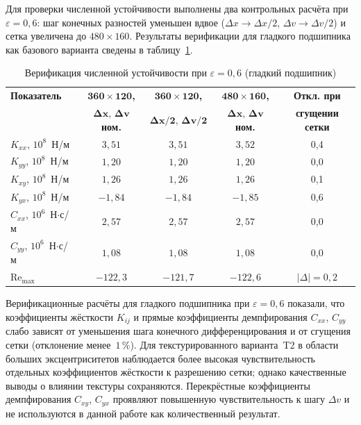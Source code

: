 Для проверки численной устойчивости выполнены два контрольных
расчёта при $\varepsilon = 0{,}6$: шаг конечных разностей
уменьшен вдвое ($\Delta x \to \Delta x/2$,
$\Delta v \to \Delta v/2$) и сетка увеличена до
$480 \times 160$. Результаты верификации для гладкого подшипника как базового
варианта сведены в таблицу~\ref{tab:dyn_verif}.

\begin{table}[!ht]
\centering
\caption{Верификация численной устойчивости при $\varepsilon = 0{,}6$
  (гладкий подшипник)}
\label{tab:dyn_verif}
\small
\begin{tabular}{|l|c|c|c|c|}
\hline
\textbf{Показатель}
  & $\mathbf{360 \times 120}$\textbf{,}
  & $\mathbf{360 \times 120}$\textbf{,}
  & $\mathbf{480 \times 160}$\textbf{,}
  & \textbf{Откл. при} \\
  & $\boldsymbol{\Delta x{,}\,\Delta v}$\textbf{ ном.}
  & $\boldsymbol{\Delta x/2{,}\,\Delta v/2}$
  & $\boldsymbol{\Delta x{,}\,\Delta v}$\textbf{ ном.}
  & \textbf{сгущении сетки} \\
\hline
$K_{xx}$, $10^8$~Н/м & $3{,}51$ & $3{,}51$ & $3{,}52$ & 0{,}4 \\
\hline
$K_{yy}$, $10^8$~Н/м & $1{,}20$ & $1{,}20$ & $1{,}20$ & 0{,}0 \\
\hline
$K_{xy}$, $10^8$~Н/м & $1{,}26$ & $1{,}26$ & $1{,}26$ & 0{,}1 \\
\hline
$K_{yx}$, $10^8$~Н/м & $-1{,}84$ & $-1{,}84$ & $-1{,}85$ & 0{,}6 \\
\hline
$C_{xx}$, $10^6$~Н$\cdot$с/м & $2{,}57$ & $2{,}57$ & $2{,}57$ & 0{,}0 \\
\hline
$C_{yy}$, $10^6$~Н$\cdot$с/м & $1{,}08$ & $1{,}08$ & $1{,}08$ & 0{,}0 \\
\hline
$\mathrm{Re}_{\max}$ & $-122{,}3$ & $-121{,}7$ & $-122{,}6$ & $|\Delta| = 0{,}2$ \\
\hline
\end{tabular}
\end{table}

\FloatBarrier

Верификационные расчёты для гладкого подшипника при
$\varepsilon = 0{,}6$ показали, что коэффициенты жёсткости
$K_{ij}$ и прямые коэффициенты демпфирования $C_{xx}$, $C_{yy}$
слабо зависят от уменьшения шага конечного дифференцирования
и от сгущения сетки (отклонение менее~$1\,\%$). Для
текстурированного варианта~T2 в области больших эксцентриситетов
наблюдается более высокая чувствительность отдельных коэффициентов
жёсткости к разрешению сетки; однако качественные выводы о влиянии
текстуры сохраняются.
Перекрёстные коэффициенты демпфирования $C_{xy}$, $C_{yx}$
проявляют повышенную чувствительность к шагу $\Delta v$
и не используются в данной работе как количественный результат.


